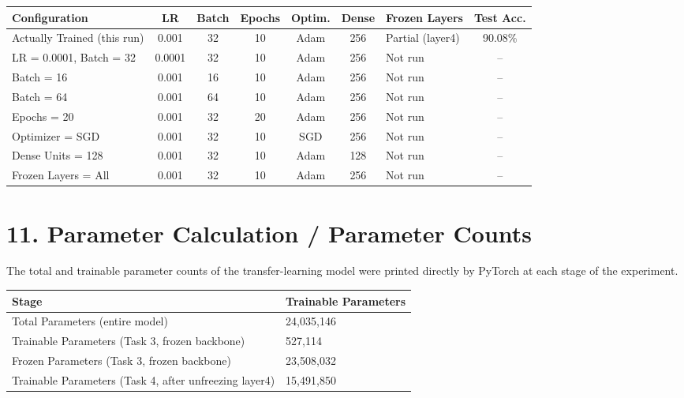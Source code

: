 \documentclass[11pt,a4paper]{article}
\begin{document}
\begin{center}
\begin{tabular}{|p{3.8cm}|c|c|c|c|c|p{2.2cm}|c|}
\hline
\textbf{Configuration} & \textbf{LR} & \textbf{Batch} & \textbf{Epochs} & \textbf{Optim.} & \textbf{Dense} & \textbf{Frozen Layers} & \textbf{Test Acc.}\\
\hline
Actually Trained (this run) & 0.001 & 32 & 10 & Adam & 256 & Partial (layer4) & 90.08\%\\
\hline
LR = 0.0001, Batch = 32 & 0.0001 & 32 & 10 & Adam & 256 & Not run & --\\
\hline
Batch = 16 & 0.001 & 16 & 10 & Adam & 256 & Not run & --\\
\hline
Batch = 64 & 0.001 & 64 & 10 & Adam & 256 & Not run & --\\
\hline
Epochs = 20 & 0.001 & 32 & 20 & Adam & 256 & Not run & --\\
\hline
Optimizer = SGD & 0.001 & 32 & 10 & SGD & 256 & Not run & --\\
\hline
Dense Units = 128 & 0.001 & 32 & 10 & Adam & 128 & Not run & --\\
\hline
Frozen Layers = All & 0.001 & 32 & 10 & Adam & 256 & Not run & --\\
\hline
\end{tabular}
\end{center}

\section*{11. Parameter Calculation / Parameter Counts}

The total and trainable parameter counts of the transfer-learning model were printed directly by PyTorch at each stage of the experiment.

\begin{center}
\begin{tabular}{|p{7cm}|p{5cm}|}
\hline
\textbf{Stage} & \textbf{Trainable Parameters}\\
\hline
Total Parameters (entire model) & 24{,}035{,}146\\
\hline
Trainable Parameters (Task 3, frozen backbone) & 527{,}114\\
\hline
Frozen Parameters (Task 3, frozen backbone) & 23{,}508{,}032\\
\hline
Trainable Parameters (Task 4, after unfreezing layer4) & 15{,}491{,}850\\
\hline
\end{tabular}
\end{center}
\end{document}
